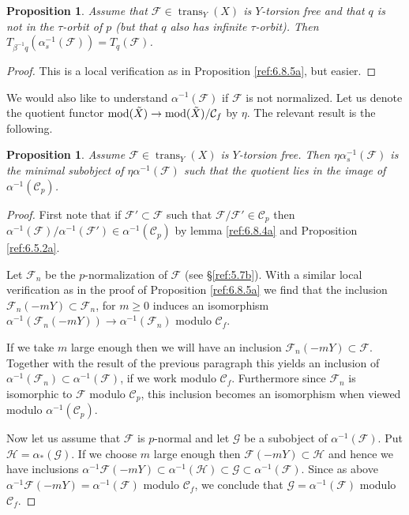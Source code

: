 \documentclass{amsproc}
\def\Cscr{{\mathcal C}}
\def\Fscr{{\mathcal F}}
\def\Gscr{{\mathcal G}}
\def\Hscr{{\mathcal H}}
\def\mod{\mathop{\text{mod}}}
\def\trans{\operatorname{trans}}
\def\r{\rightarrow}
\let\oldtext\text
\def\text#1{\oldtext{\upshape #1}}
\newtheorem{propositions}[lemmas]{Proposition}
\theoremstyle{definition}
\theoremstyle{remark}
\numberwithin{equation}{section}
\numberwithin{table}{section}
\numberwithin{figure}{section}
\begin{document}
\begin{propositions} 
\label{ref:6.8.6a} Assume that $\Fscr\in\trans_Y(X)$ is $Y$-torsion
free and that $q$ is not in the $\tau$-orbit of $p$ (but that $q$ also
has infinite $\tau$-orbit). Then
$T_{\beta^{-1}q}(\alpha_s^{-1}(\Fscr))=T_q(\Fscr)$.
\end{propositions}
\begin{proof} This is a local verification as in Proposition
  \ref{ref:6.8.5a}, but easier. 
\end{proof}
We would also like to understand $\alpha^{-1}(\Fscr)$ if $\Fscr$ is
not normalized. Let us denote the quotient functor $\mod(\tilde{X})\r
\mod(\tilde{X})/\Cscr_{f}$ by
$\eta$. The relevant result is the following.
\begin{propositions}
\label{ref:6.8.7a}
 Assume $\Fscr\in \trans_Y(X)$ is $Y$-torsion free.
Then
 $\eta\alpha^{-1}_s(\Fscr)$ is the minimal subobject of
$\eta\alpha^{-1}(\Fscr)$ such that the quotient lies in the image of
 $\alpha^{-1}(\Cscr_p)$. 
\end{propositions}
\begin{proof}
  First note that if $\Fscr'\subset \Fscr$ such that
  $\Fscr/\Fscr'\in\Cscr_p$ then
  $\alpha^{-1}(\Fscr)/\alpha^{-1}(\Fscr')\in \alpha^{-1}(\Cscr_p)$ by
  lemma \ref{ref:6.8.4a} and Proposition
  \ref{ref:6.5.2a}.

Let $\Fscr_n$ be the $p$-normalization of $\Fscr$ (see
\S\ref{ref:5.7b}). With a similar local
verification as in the proof of Proposition \ref{ref:6.8.5a} we find that the
inclusion $\Fscr_n(-mY)\subset \Fscr_n$, for $m\ge 0$ induces an
isomorphism $\alpha^{-1}(\Fscr_n(-mY))\r \alpha^{-1}(\Fscr_n)$ modulo
$\Cscr_{f}$. 

If we take $m$ large enough then we will have an inclusion
$\Fscr_n(-mY)\subset \Fscr$. Together with the result of the previous
paragraph this  yields an inclusion of $\alpha^{-1}(\Fscr_n)\subset
\alpha^{-1}(\Fscr)$, if we work modulo
$\Cscr_{f}$. Furthermore since $\Fscr_n$ is isomorphic to
$\Fscr$ modulo $\Cscr_p$, this  inclusion becomes an isomorphism when
viewed modulo $\alpha^{-1}(\Cscr_p)$.

Now let us assume that $\Fscr$ is $p$-normal and let $\Gscr$ be a
subobject of $\alpha^{-1}(\Fscr)$. Put $\Hscr=\alpha_\ast(\Gscr)$. If
we choose $m$ large enough then $\Fscr(-mY)\subset \Hscr$ and hence we
have inclusions $\alpha^{-1}\Fscr(-mY)\subset
\alpha^{-1}(\Hscr)\subset \Gscr \subset \alpha^{-1}(\Fscr)$.  Since as
above $\alpha^{-1} \Fscr(-mY)= \alpha^{-1}(\Fscr)$ modulo
$\Cscr_{f}$, we conclude that $\Gscr=\alpha^{-1}(\Fscr)$ modulo
$\Cscr_{f}$.
\end{proof}
\end{document}
